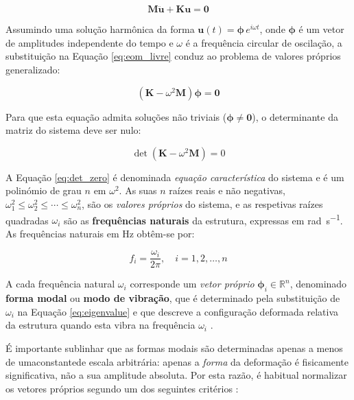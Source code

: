 \documentclass[11pt,twoside,a4paper]{report}
\begin{document}
\begin{equation}
    \mathbf{M}\ddot{\mathbf{u}} + \mathbf{K}\mathbf{u} = \mathbf{0}
    \label{eq:eom_livre}
\end{equation}

Assumindo uma solução harmônica da forma $\mathbf{u}(t) = \boldsymbol{\phi} \, e^{i\omega t}$, onde $\boldsymbol{\phi}$ é um vetor de amplitudes independente do tempo e $\omega$ é a frequência circular de oscilação, a substituição na Equação \eqref{eq:eom_livre} conduz ao problema de valores próprios generalizado:

\begin{equation}
    \left( \mathbf{K} - \omega^2 \mathbf{M} \right) \boldsymbol{\phi} 
    = \mathbf{0}
    \label{eq:eigenvalue}
\end{equation}

Para que esta equação admita soluções não triviais ($\boldsymbol{\phi} \neq \mathbf{0}$), o determinante da matriz do sistema deve ser nulo:

\begin{equation}
    \det\left( \mathbf{K} - \omega^2 \mathbf{M} \right) = 0
    \label{eq:det_zero}
\end{equation}

A Equação \eqref{eq:det_zero} é denominada \textit{equação característica} do sistema e é um polinómio de grau $n$ em $\omega^2$. As suas $n$ raízes reais e não negativas, $\omega_1^2 \leq \omega_2^2 \leq \cdots \leq \omega_n^2$, são os \textit{valores próprios} do sistema, e as respetivas raízes quadradas $\omega_i$ são as \textbf{frequências naturais} da estrutura, expressas em \si{\radian\per\second}. As frequências naturais em \si{\hertz} obtêm-se por:

\begin{equation}
    f_i = \frac{\omega_i}{2\pi}, \quad i = 1, 2, \ldots, n
    \label{eq:freq_hz}
\end{equation}

A cada frequência natural $\omega_i$ corresponde um \textit{vetor próprio} $\boldsymbol{\phi}_i \in \mathbb{R}^n$, denominado \textbf{forma modal} ou \textbf{modo de vibração}, que é determinado pela substituição de $\omega_i$ na Equação \eqref{eq:eigenvalue} e que descreve a configuração deformada relativa da estrutura quando esta vibra na frequência $\omega_i$ \cite{Ewins2000, Maia1997}.

É importante sublinhar que as formas modais são determinadas apenas a menos de umaconstantede escala arbitrária: apenas a \textit{forma} da deformação é fisicamente significativa, não a sua amplitude absoluta. Por esta razão, é habitual normalizar os vetores próprios segundo um dos seguintes critérios \cite{Craig2006}:
\end{document}
